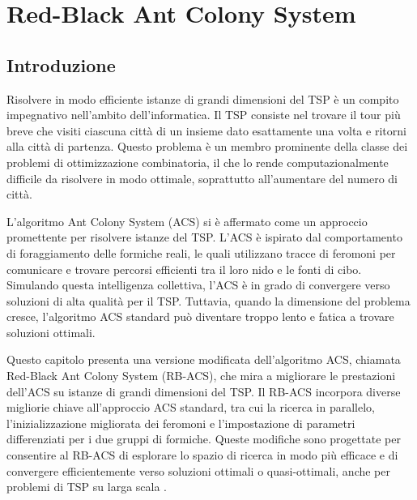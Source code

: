 
%

\chapter{Red-Black Ant Colony System}
\label{chapt:6}

\section{Introduzione}
Risolvere in modo efficiente istanze di grandi dimensioni del \gls{TSP} è un compito impegnativo nell'ambito dell'informatica. Il \gls{TSP} consiste nel trovare il tour più breve che visiti ciascuna città di un insieme dato esattamente una volta e ritorni alla città di partenza. Questo problema è un membro prominente della classe dei problemi di ottimizzazione combinatoria, il che lo rende computazionalmente difficile da risolvere in modo ottimale, soprattutto all'aumentare del numero di città.

L'algoritmo Ant Colony System (\gls{ACS}) si è affermato come un approccio promettente per risolvere istanze del \gls{TSP}. L'\gls{ACS} è ispirato dal comportamento di foraggiamento delle formiche reali, le quali utilizzano tracce di feromoni per comunicare e trovare percorsi efficienti tra il loro nido e le fonti di cibo. Simulando questa intelligenza collettiva, l'\gls{ACS} è in grado di convergere verso soluzioni di alta qualità per il \gls{TSP}. Tuttavia, quando la dimensione del problema cresce, l'algoritmo  \gls{ACS} standard può diventare troppo lento e fatica a trovare soluzioni ottimali.

Questo capitolo presenta una versione modificata dell'algoritmo \gls{ACS}, chiamata Red-Black Ant Colony System (\gls{RB-ACS}), che mira a migliorare le prestazioni dell'\gls{ACS} su istanze di grandi dimensioni del \gls{TSP}. Il \gls{RB-ACS} incorpora diverse migliorie chiave all'approccio  \gls{ACS} standard, tra cui la ricerca in parallelo, l'inizializzazione migliorata dei feromoni e l'impostazione di parametri differenziati per i due gruppi di formiche. Queste modifiche sono progettate per consentire al \gls{RB-ACS} di esplorare lo spazio di ricerca in modo più efficace e di convergere efficientemente verso soluzioni ottimali o quasi-ottimali, anche per problemi di \gls{TSP} su larga scala \cite{Hassan2013}.

